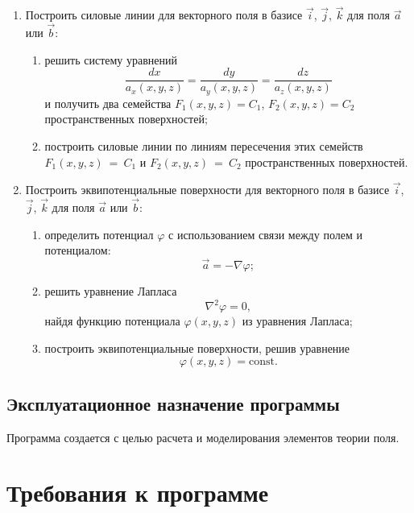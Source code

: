 \documentclass[14pt,a4paper,final]{extreport}
\begin{document}
\begin{enumerate}[label=\arabic*.]
	\item Построить силовые линии для векторного поля в базисе \( \vec i \), \( \vec j \), \( \vec k \) для поля \( \vec a \) или \( \vec b \):
	
	\begin{enumerate}[label=\theenumi\arabic*]
		\item решить систему уравнений \[ \frac{dx}{a_x(x, y, z)} = \frac{dy}{a_y(x, y, z)} = \frac{dz}{a_z(x, y, z)} \]  и получить два семейства \( F_1(x, y, z) = C_1 \), \( F_2(x, y, z) = C_2 \) пространственных поверхностей;
		
		\item построить силовые линии по линиям пересечения этих семейств \( F_1(x, y, z)~=~C_1 \) и \( F_2(x, y, z)~=~C_2 \) пространственных поверхностей.
	\end{enumerate}
	
	\item Построить эквипотенциальные поверхности для векторного поля в базисе \( \vec i \), \( \vec j \), \( \vec k \) для поля \( \vec a \) или \( \vec b \):
	
	\begin{enumerate}[label=\theenumi\arabic*]
		\item определить потенциал \( \varphi \) с использованием связи между полем и потенциалом: \[ \vec a = -\nabla \varphi ;\]
		
		\item решить уравнение Лапласа \[ \nabla^2 \varphi = 0, \]найдя функцию потенциала \( \varphi (x, y, z) \) из уравнения Лапласа;
\pagebreak %
		
		\item построить эквипотенциальные поверхности, решив уравнение \[ \varphi (x, y, z) = \mathrm{const} .\]
	\end{enumerate}
\end{enumerate}

\fancyhead[C]{\bfseries\thepage\\\docstamp}  %

\section{Эксплуатационное назначение программы}
Программа создается с целью расчета и моделирования элементов теории поля.



\chapter{Требования к программе}
\end{document}
